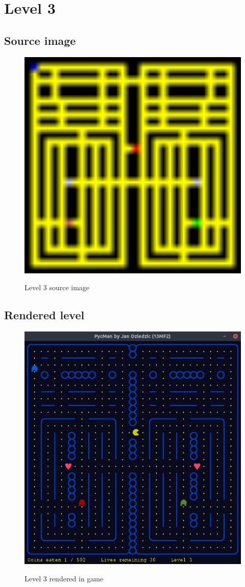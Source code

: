\documentclass[11pt,a4paper,notitlepage]{report}
\newcommand{\dsubsection}[1]{\FloatBarrier \subsection{#1}}
\newenvironment{img}{
	\begin{center}
		\begin{figure}[H]
			\begin{center}
			
}{
	\end{center}
		\end{figure}
			\end{center}
}
\begin{document}
		\section{Level 3}
			\dsubsection{Source image}
			\begin{img}
				\includegraphics[width=350pt]{images/level3}\\
				\caption{Level 3 source image}
			\end{img}
			\dsubsection{Rendered level}
			\begin{img}
				\includegraphics[width=350pt]{images/level3_r}\\
				\caption{Level 3 rendered in game}
			\end{img}
\end{document}
